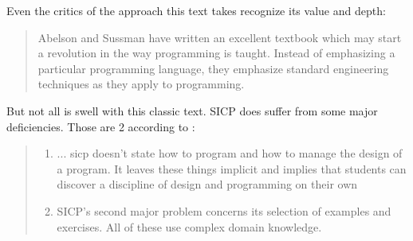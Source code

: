 Even the critics of the approach this text takes recognize its value and
depth\cite{education:wadler__a_critique_of_abelson_and_sussman}:

\begin{quotation}
    Abelson and Sussman have written an excellent textbook  which may start a
    revolution in the way programming is taught.
    Instead of emphasizing a particular programming language, they emphasize standard
    engineering techniques as they apply to programming.
\end{quotation}

But not all is swell with this classic text. SICP does suffer from some
major deficiencies. Those are 2 according to \cite{education:felleisen__sicsc}:

\begin{quote}
    \begin{enumerate}
        \item ... sicp doesn’t state how to program and how to manage the design
        of a program. It leaves these things implicit and implies that students
        can discover a discipline of design and programming on their own

        \item SICP’s second major problem concerns its selection of examples and
        exercises. All of these use complex domain knowledge.
    \end{enumerate}
\end{quote}


